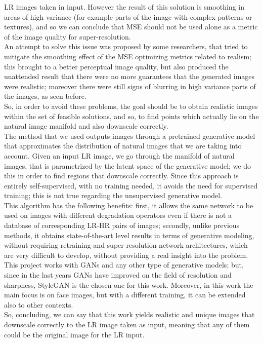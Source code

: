\documentclass[12pt]{article}
\begin{document}
	LR images taken in input. However the result of this solution is smoothing in areas of high variance (for example parts of the image
	with complex patterns or textures), and so we can conclude that MSE should not be used alone as a metric of the image quality for super-resolution.\\
	An attempt to solve this issue was proposed by some researchers, that tried to mitigate the smoothing effect of the MSE optimizing metrics 
	related to realism; this brought to a better perceptual image quality, but also produced the unattended result that there 
	were no more guarantees that the generated images were realistic; moreover there were still signs of blurring in high variance parts
	of the images, as seen before.\\
	So, in order to avoid these problems, the goal should be to obtain realistic images within the set of feasible solutions, and so,
	to find points which actually lie on the natural image manifold and also downscale correctly.\\
	The method that we used outputs images through a pretrained generative model that approximates the distribution of natural images
	that we are taking into account. Given an input LR image, we go through the manifold of natural images, that is parametrized by
	the latent space of the generative model; we do this in order to find regions that downscale correctly.
	Since this approach is entirely self-supervised, with no training needed, it avoids the need for supervised training; this is not true
	regarding the unsupervised generative model.\\
	This algorithm has the following benefits: first, it allows the same network to be used on images with different degradation
	operators even if there is not a database of corresponding LR-HR pairs of images; secondly, unlike previous methods, 
	it obtains state-of-the-art level results in terms of generative modeling, without requiring retraining and super-resolution network
	architectures, which are very difficult to develop, without providing a real insight into the problem.
	This project works with GANs and any other type of generative models; but, since in the last years GANs have improved on the field of resolution
	and sharpness, StyleGAN is the chosen one for this work. Moreover, in this work the main focus is on face images, but with a different training, 
	it can be extended also to other contexts.\\
	So, concluding, we can say that this work yields realistic and unique images that downscale correctly to the LR image taken as input, meaning that
	any of them could be the original image for the LR input.
\end{document}

